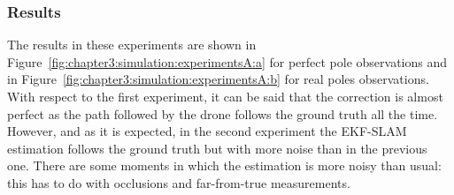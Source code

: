 \subsubsection{Results}
\label{subsubsec:chapter3:simulation:a:results}
The results in these experiments are shown in Figure~\ref{fig:chapter3:simulation:experimentsA:a} for perfect pole observations and in Figure~\ref{fig:chapter3:simulation:experimentsA:b} for real poles observations. With respect to the first experiment, it can be said that the correction is almost perfect as the path followed by the drone follows the ground truth all the time. However, and as it is expected, in the second experiment the EKF-SLAM estimation follows the ground truth but with more noise than in the previous one. There are some moments in which the estimation is more noisy than usual: this has to do with occlusions and far-from-true measurements.
